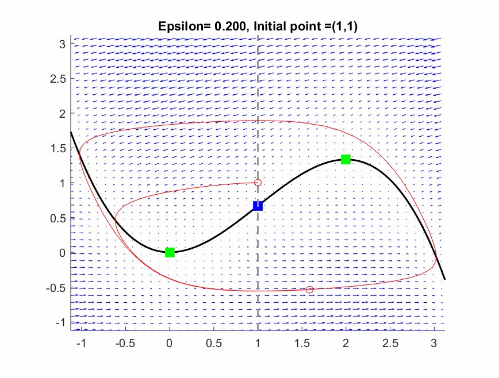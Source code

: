 \documentclass[25pt, a0paper, portrait]{tikzposter}
\begin{document}
\begin{columns}
{\begin{tikzfigure}[h!]
	\centering
	\includegraphics[height=20cm,width=26cm]{Posterpic1.jpg}
\end{tikzfigure}
}
{
\begin{tikzfigure}[h!]
	\centering

\end{tikzfigure}}
\end{columns}
\end{document}

